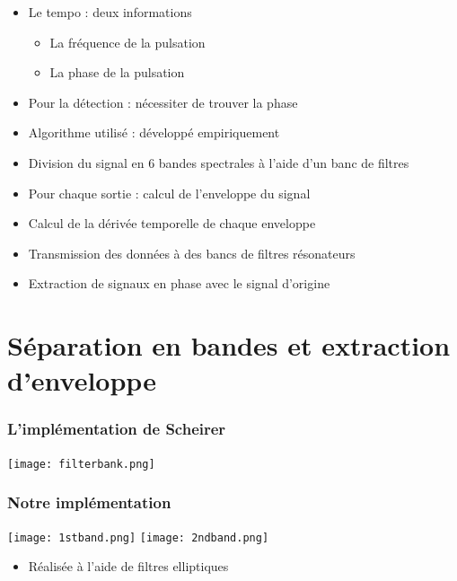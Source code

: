 \documentclass{beamer}
\begin{document}
 \begin{frame}
  \begin{itemize}
   \item Le tempo : deux informations
   \begin{itemize}
   \item<2-> La fréquence de la pulsation
   \item<3-> La phase de la pulsation
   \end{itemize}
   \item<4-> Pour la détection : nécessiter de trouver la phase
   \item<5-> Algorithme utilisé : développé empiriquement
  \end{itemize}

 \end{frame}

 \begin{frame}
  \begin{itemize}
   \item Division du signal en 6 bandes spectrales à l'aide d'un banc de filtres
   \item<2-> Pour chaque sortie : calcul de l'enveloppe du signal
   \item<3-> Calcul de la dérivée temporelle de chaque enveloppe
   \item<4-> Transmission des données à des bancs de filtres résonateurs
   \item<5-> Extraction de signaux en phase avec le signal d'origine
  \end{itemize}
 \end{frame}

 \section{Séparation en bandes et extraction d'enveloppe}
 
  \begin{frame}
       \tableofcontents[currentsection]
\end{frame}

 \begin{frame}
    \frametitle{L'implémentation de Scheirer}
    \begin{center}
   \texttt{[image: filterbank.png]}
   \end{center}
 \end{frame}
 
  \begin{frame}
    \frametitle{Notre implémentation}
   \texttt{[image: 1stband.png]}
   \texttt{[image: 2ndband.png]}
     \begin{itemize}
   \item<2-> Réalisée à l'aide de filtres elliptiques
  \end{itemize}
 \end{frame}
 
\end{document}
